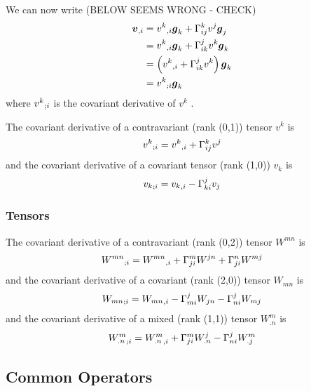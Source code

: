 We can now write (BELOW SEEMS WRONG - CHECK)
\begin{equation}
  \begin{split}
     {\ensuremath{ \boldsymbol{v} }}_{,i} &= {v^{k}}_{,i}  \boldsymbol{g} _{k}+ \Gamma^{k}_{ij} v^{j} \boldsymbol{g} _{j}\\
    &= {v^{k}}_{,i}  \boldsymbol{g} _{k}+ \Gamma^{j}_{ik} v^{k} \boldsymbol{g} _{k}\\
    &=\left(  {v^{k}}_{,i} + \Gamma^{j}_{ik} v^{k} \right) \boldsymbol{g} _{k}\\
    &= {v^{k}}_{;i}  \boldsymbol{g} _{k}
  \end{split}
\end{equation}
where $ {v^{k}}_{;i} $ is the covariant derivative of $v^{k}$ . 

The covariant derivative of a contravariant (rank (0,1)) tensor $v^{k}$ is
\begin{equation}
   {v^{k}}_{;i}  = {v^{k}}_{,i} + \Gamma^{k}_{ij} v^{j}
\end{equation}
and the covariant derivative of a covariant tensor  (rank (1,0)) $v_{k}$ is
\begin{equation}
   {v_{k}}_{;i}  = {v_{k}}_{,i} - \Gamma^{j}_{ki} v_{j}
\end{equation}

\subsubsection{Tensors}

The covariant derivative of a contravariant (rank (0,2)) tensor $W^{mn}$ is
\begin{equation}
   {W^{mn}}_{;i} = {W^{mn}}_{,i} + \Gamma^{m}_{ji} W^{jn}+ \Gamma^{n}_{ji} W^{mj}
\end{equation}
and the covariant derivative of a covariant (rank (2,0)) tensor $W_{mn}$ is
\begin{equation}
   {W_{mn}}_{;i} = {W_{mn}}_{,i} - \Gamma^{j}_{mi} W_{jn}- \Gamma^{j}_{ni} W_{mj}
\end{equation}
and the covariant derivative of a mixed (rank (1,1)) tensor $W^{m}_{.n}$ is
\begin{equation}
   {W^{m}_{.n}}_{;i} = {W^{m}_{.n}}_{,i} + \Gamma^{m}_{ji} W^{j}_{.n}- \Gamma^{j}_{ni} W^{m}_{.j}
\end{equation}

\subsection{Common Operators}

